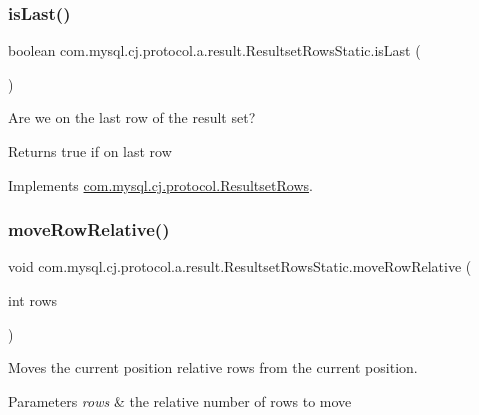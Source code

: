 \subsubsection{\texorpdfstring{is\+Last()}{isLast()}}
{\footnotesize\ttfamily boolean com.\+mysql.\+cj.\+protocol.\+a.\+result.\+Resultset\+Rows\+Static.\+is\+Last (\begin{DoxyParamCaption}{ }\end{DoxyParamCaption})}

Are we on the last row of the result set?

\begin{DoxyReturn}{Returns}
true if on last row 
\end{DoxyReturn}


Implements \mbox{\hyperlink{interfacecom_1_1mysql_1_1cj_1_1protocol_1_1_resultset_rows_ae52ab20020adafaf87c2f45bae82980d}{com.\+mysql.\+cj.\+protocol.\+Resultset\+Rows}}.

\mbox{\label{classcom_1_1mysql_1_1cj_1_1protocol_1_1a_1_1result_1_1_resultset_rows_static_ac6527b7e8cbc7cb3ec0c67c854f145b7}} 
\subsubsection{\texorpdfstring{move\+Row\+Relative()}{moveRowRelative()}}
{\footnotesize\ttfamily void com.\+mysql.\+cj.\+protocol.\+a.\+result.\+Resultset\+Rows\+Static.\+move\+Row\+Relative (\begin{DoxyParamCaption}\item[{int}]{rows }\end{DoxyParamCaption})}

Moves the current position relative \textquotesingle{}rows\textquotesingle{} from the current position.


\begin{DoxyParams}{Parameters}
{\em rows} & the relative number of rows to move \\
\hline
\end{DoxyParams}


